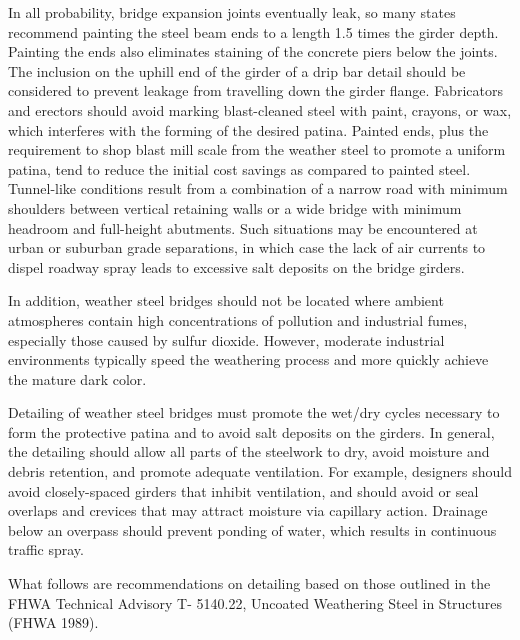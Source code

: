 In all probability, bridge expansion joints eventually leak, so many states recommend painting the steel beam
ends to a length 1.5 times the girder depth. Painting the ends also eliminates staining of the concrete piers below the
joints. The inclusion on the uphill end of the girder of a drip bar detail should be considered to prevent leakage from
travelling down the girder flange. Fabricators and erectors should avoid marking blast-cleaned steel with paint,
crayons, or wax, which interferes with the forming of the desired patina. Painted ends, plus the requirement to shop
blast mill scale from the weather steel to promote a uniform patina, tend to reduce the initial cost savings as
compared to painted steel. Tunnel-like conditions result from a combination of a narrow road with minimum
shoulders between vertical retaining walls or a wide bridge with minimum headroom and full-height abutments.
Such situations may be encountered at urban or suburban grade separations, in which case the lack of air currents to
dispel roadway spray leads to excessive salt deposits on the bridge girders.

In addition, weather steel bridges should not be located where ambient atmospheres contain high concentrations
of pollution and industrial fumes, especially those caused by sulfur dioxide. However, moderate industrial
environments typically speed the weathering process and more quickly achieve the mature dark color.

Detailing of weather steel bridges must promote the wet/dry cycles necessary to form the protective patina and to
avoid salt deposits on the girders. In general, the detailing should allow all parts of the steelwork to dry, avoid
moisture and debris retention, and promote adequate ventilation. For example, designers should avoid closely-spaced
girders that inhibit ventilation, and should avoid or seal overlaps and crevices that may attract moisture via capillary
action. Drainage below an overpass should prevent ponding of water, which results in continuous traffic spray.

What follows are recommendations on detailing based on those outlined in the FHWA Technical Advisory T-
5140.22, Uncoated Weathering Steel in Structures (FHWA 1989).

